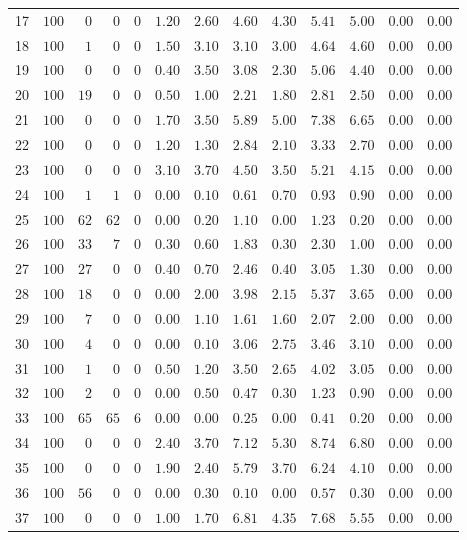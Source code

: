 \documentclass{article}
\begin{document}
\begin{landscape}
\begin{longtable}{lrrrrrrrrrrrr}
17&$100$&$ 0$&$ 0$&$ 0$&$1.20$&$2.60$&$ 4.60$&$ 4.30$&$ 5.41$&$ 5.00$&$0.00$&$0.00$\\
18&$100$&$ 1$&$ 0$&$ 0$&$1.50$&$3.10$&$ 3.10$&$ 3.00$&$ 4.64$&$ 4.60$&$0.00$&$0.00$\\
19&$100$&$ 0$&$ 0$&$ 0$&$0.40$&$3.50$&$ 3.08$&$ 2.30$&$ 5.06$&$ 4.40$&$0.00$&$0.00$\\
20&$100$&$19$&$ 0$&$ 0$&$0.50$&$1.00$&$ 2.21$&$ 1.80$&$ 2.81$&$ 2.50$&$0.00$&$0.00$\\
21&$100$&$ 0$&$ 0$&$ 0$&$1.70$&$3.50$&$ 5.89$&$ 5.00$&$ 7.38$&$ 6.65$&$0.00$&$0.00$\\
22&$100$&$ 0$&$ 0$&$ 0$&$1.20$&$1.30$&$ 2.84$&$ 2.10$&$ 3.33$&$ 2.70$&$0.00$&$0.00$\\
23&$100$&$ 0$&$ 0$&$ 0$&$3.10$&$3.70$&$ 4.50$&$ 3.50$&$ 5.21$&$ 4.15$&$0.00$&$0.00$\\
24&$100$&$ 1$&$ 1$&$ 0$&$0.00$&$0.10$&$ 0.61$&$ 0.70$&$ 0.93$&$ 0.90$&$0.00$&$0.00$\\
25&$100$&$62$&$62$&$ 0$&$0.00$&$0.20$&$ 1.10$&$ 0.00$&$ 1.23$&$ 0.20$&$0.00$&$0.00$\\
26&$100$&$33$&$ 7$&$ 0$&$0.30$&$0.60$&$ 1.83$&$ 0.30$&$ 2.30$&$ 1.00$&$0.00$&$0.00$\\
27&$100$&$27$&$ 0$&$ 0$&$0.40$&$0.70$&$ 2.46$&$ 0.40$&$ 3.05$&$ 1.30$&$0.00$&$0.00$\\
28&$100$&$18$&$ 0$&$ 0$&$0.00$&$2.00$&$ 3.98$&$ 2.15$&$ 5.37$&$ 3.65$&$0.00$&$0.00$\\
29&$100$&$ 7$&$ 0$&$ 0$&$0.00$&$1.10$&$ 1.61$&$ 1.60$&$ 2.07$&$ 2.00$&$0.00$&$0.00$\\
30&$100$&$ 4$&$ 0$&$ 0$&$0.00$&$0.10$&$ 3.06$&$ 2.75$&$ 3.46$&$ 3.10$&$0.00$&$0.00$\\
31&$100$&$ 1$&$ 0$&$ 0$&$0.50$&$1.20$&$ 3.50$&$ 2.65$&$ 4.02$&$ 3.05$&$0.00$&$0.00$\\
32&$100$&$ 2$&$ 0$&$ 0$&$0.00$&$0.50$&$ 0.47$&$ 0.30$&$ 1.23$&$ 0.90$&$0.00$&$0.00$\\
33&$100$&$65$&$65$&$ 6$&$0.00$&$0.00$&$ 0.25$&$ 0.00$&$ 0.41$&$ 0.20$&$0.00$&$0.00$\\
34&$100$&$ 0$&$ 0$&$ 0$&$2.40$&$3.70$&$ 7.12$&$ 5.30$&$ 8.74$&$ 6.80$&$0.00$&$0.00$\\
35&$100$&$ 0$&$ 0$&$ 0$&$1.90$&$2.40$&$ 5.79$&$ 3.70$&$ 6.24$&$ 4.10$&$0.00$&$0.00$\\
36&$100$&$56$&$ 0$&$ 0$&$0.00$&$0.30$&$ 0.10$&$ 0.00$&$ 0.57$&$ 0.30$&$0.00$&$0.00$\\
37&$100$&$ 0$&$ 0$&$ 0$&$1.00$&$1.70$&$ 6.81$&$ 4.35$&$ 7.68$&$ 5.55$&$0.00$&$0.00$\\

\end{longtable}
\end{landscape}
\end{document}
